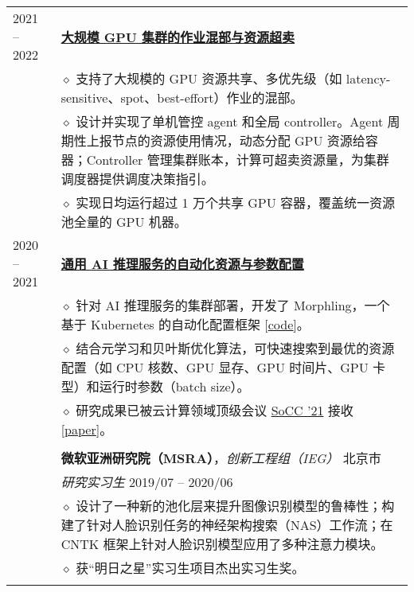 \documentclass[letterpaper, 10pt]{article}
\begin{document}
\begin{longtable}{p{0.7in}p{6.0in}}
2021 -- 2022
& \textbf{\underline{大规模 GPU 集群的作业混部与资源超卖}} \hfill \\
    & $\diamond$ 支持了大规模的 GPU 资源共享、多优先级（如 latency-sensitive、spot、best-effort）作业的混部。\\
    & $\diamond$ 设计并实现了单机管控 agent 和全局 controller。Agent 周期性上报节点的资源使用情况，动态分配 GPU 资源给容器；Controller 管理集群账本，计算可超卖资源量，为集群调度器提供调度决策指引。\\
    & $\diamond$ 实现日均运行超过 1 万个共享 GPU 容器，覆盖统一资源池全量的 GPU 机器。\\

2020 -- 2021
& \textbf{\underline{通用 AI 推理服务的自动化资源与参数配置}} \hfill \\
    & $\diamond$ 针对 AI 推理服务的集群部署，开发了 Morphling，一个基于 Kubernetes 的自动化配置框架 [\href{https://github.com/kubedl-io/morphling}{\underline{code}}]。\\
    & $\diamond$ 结合元学习和贝叶斯优化算法，可快速搜索到最优的资源配置（如 CPU 核数、GPU 显存、GPU 时间片、GPU 卡型）和运行时参数（batch size）。\\
    & $\diamond$ 研究成果已被云计算领域顶级会议 \underline{SoCC '21} 接收 [\href{https://dl.acm.org/doi/10.1145/3472883.3486987}{\underline{paper}}]。\\
& \\

& \textbf{微软亚洲研究院（MSRA）}，\textit{创新工程组（IEG）} \hfill 北京市\\
& \textit{研究实习生} \hfill 2019/07 -- 2020/06 \\
& $\diamond$ 设计了一种新的池化层来提升图像识别模型的鲁棒性；构建了针对人脸识别任务的神经架构搜索（NAS）工作流；在 CNTK 框架上针对人脸识别模型应用了多种注意力模块。\\
& $\diamond$ 获“明日之星”实习生项目杰出实习生奖。\\
& \\


\end{longtable}
\end{document}
